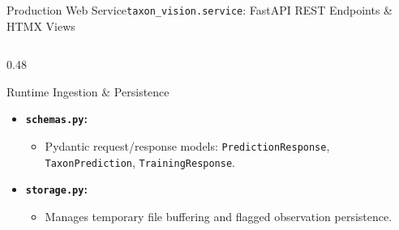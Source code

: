 \begin{frame}{Production Web Service}{\texttt{taxon\_vision.service}: FastAPI REST Endpoints \& HTMX Views}
\begin{columns}[T]
\begin{column}{0.48\textwidth}
\begin{block}{Runtime Ingestion \& Persistence}
\begin{itemize}
\begin{itemize}
                            \item \texttt{run\_prediction()}: High-speed inference taking uploaded image files.
                        \end{itemize}
                    \item \textbf{\texttt{schemas.py}:}
                        \begin{itemize}\tiny
                            \item Pydantic request/response models: \texttt{PredictionResponse}, \texttt{TaxonPrediction}, \texttt{TrainingResponse}.
                        \end{itemize}
                    \item \textbf{\texttt{storage.py}:}
                        \begin{itemize}\tiny
                            \item Manages temporary file buffering and flagged observation persistence.
                        \end{itemize}
                \end{itemize}
            \end{block}
        \end{column}
    \end{columns}


\end{frame}

